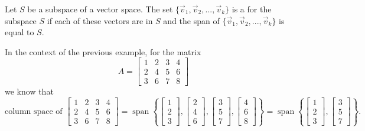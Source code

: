 \documentclass{ximera}
\begin{document}
\begin{definition}
Let $S$ be a subspace of a vector space. The set $\{\vec{v}_1, \vec{v}_2, ..., \vec{v}_k\}$ is a \emph{} for the subspace $S$ if each of these vectors are in $S$ and the span of $\{\vec{v}_1, \vec{v}_2, ..., \vec{v}_k\}$ is equal to $S$. 
\end{definition}

In the context of the previous example, for the matrix
\begin{equation*}
    A = \begin{bmatrix}
        1 & 2 & 3 & 4 \\
        2 & 4 & 5 & 6 \\
        3 & 6 & 7 & 8
    \end{bmatrix} 
\end{equation*}
we know that 
\begin{equation*}
    \text{column space of }
    \begin{bmatrix}
        1 & 2 & 3 & 4 \\
        2 & 4 & 5 & 6 \\
        3 & 6 & 7 & 8
    \end{bmatrix}
    = \operatorname{span}
    \left\{
        \begin{bmatrix}
            1 \\
            2 \\
            3 
        \end{bmatrix}
        ,
        \begin{bmatrix}
            2 \\
            4 \\
            6
        \end{bmatrix}
        ,
        \begin{bmatrix}
            3 \\
            5 \\
            7
        \end{bmatrix}
        ,
        \begin{bmatrix}
            4 \\
            6 \\
            8
        \end{bmatrix}
    \right\}
    = \operatorname{span}
    \left\{
        \begin{bmatrix}
            1 \\
            2 \\
            3
        \end{bmatrix}
        ,
        \begin{bmatrix}
            3 \\
            5 \\
            7
        \end{bmatrix}
    \right\} .
\end{equation*}
\end{document}
